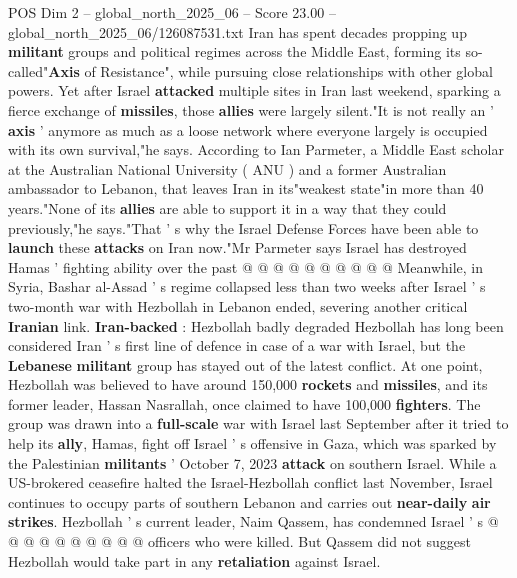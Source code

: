 \begin{textsample}{POS Dim 2 – global\_north\_2025\_06 – Score 23.00 – global\_north\_2025\_06/126087531.txt}  \label{ex:f2_pos_356}
Iran has spent decades propping up \textbf{militant} groups and political regimes across the Middle East, forming its so-called"\textbf{Axis} of Resistance", while pursuing close relationships with other global powers.
Yet after Israel \textbf{attacked} multiple sites in Iran last weekend, sparking a fierce exchange of \textbf{missiles}, those \textbf{allies} were largely silent."It is not really an ' \textbf{axis} ' anymore as much as a loose network where everyone largely is occupied with its own survival,"he says.
According to Ian Parmeter, a Middle East scholar at the Australian National University ( ANU ) and a former Australian ambassador to Lebanon, that leaves Iran in its"weakest state"in more than 40 years."None of its \textbf{allies} are able to support it in a way that they could previously,"he says."That ' s why the Israel Defense Forces have been able to \textbf{launch} these \textbf{attacks} on Iran now."Mr Parmeter says Israel has destroyed Hamas ' fighting ability over the past @ @ @ @ @ @ @ @ @ @ Meanwhile, in Syria, Bashar al-Assad ' s regime collapsed less than two weeks after Israel ' s two-month war with Hezbollah in Lebanon ended, severing another critical \textbf{Iranian} link. \textbf{Iran-backed} : Hezbollah badly degraded Hezbollah has long been considered Iran ' s first line of defence in case of a war with Israel, but the \textbf{Lebanese} \textbf{militant} group has stayed out of the latest conflict.
At one point, Hezbollah was believed to have around 150,000 \textbf{rockets} and \textbf{missiles}, and its former leader, Hassan Nasrallah, once claimed to have 100,000 \textbf{fighters}.
The group was drawn into a \textbf{full-scale} war with Israel last September after it tried to help its \textbf{ally}, Hamas, fight off Israel ' s offensive in Gaza, which was sparked by the Palestinian \textbf{militants} ' October 7, 2023 \textbf{attack} on southern Israel.
While a US-brokered ceasefire halted the Israel-Hezbollah conflict last November, Israel continues to occupy parts of southern Lebanon and carries out \textbf{near-daily} \textbf{air} \textbf{strikes}.
Hezbollah ' s current leader, Naim Qassem, has condemned Israel ' s @ @ @ @ @ @ @ @ @ @ officers who were killed.
But Qassem did not suggest Hezbollah would take part in any \textbf{retaliation} against Israel.

\end{textsample}

